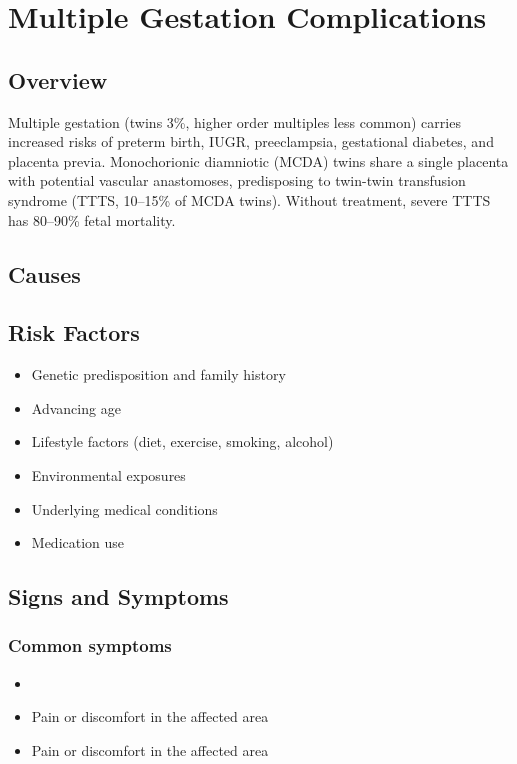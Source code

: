 \chapter{Multiple Gestation Complications}
\label{sec:Multiple Gestation Complications}

\section{Overview}
Multiple gestation (twins 3\%, higher order multiples less common) carries increased risks of preterm birth, IUGR, preeclampsia, gestational diabetes, and placenta previa. Monochorionic diamniotic (MCDA) twins share a single placenta with potential vascular anastomoses, predisposing to twin-twin transfusion syndrome (TTTS, 10--15\% of MCDA twins). Without treatment, severe TTTS has 80--90\% fetal mortality.
\section{Causes}
\section{Risk Factors}

\begin{itemize}[noitemsep]
  \item Genetic predisposition and family history
  \item Advancing age
  \item Lifestyle factors (diet, exercise, smoking, alcohol)
  \item Environmental exposures
  \item Underlying medical conditions
  \item Medication use
\end{itemize}
\section{Signs and Symptoms}

\subsection{Common symptoms}
\begin{itemize}[noitemsep]
  \item \item Pain or discomfort in the affected area    \item Pain or discomfort in the affected area
  \end{itemize}

